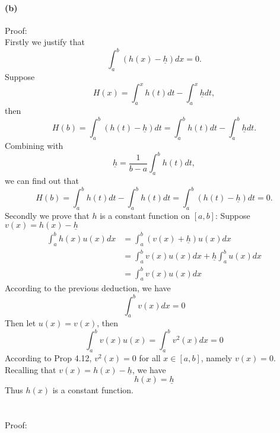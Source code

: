 \documentclass{article}
\begin{document}
\paragraph{(b)} Proof:\\
Firstly we justify that
$$\int_{a}^{b}(h(x)-\underline{h})dx=0.$$
Suppose $$H(x)=\int_{a}^{x}h(t)dt-\int_{a}^{x}\underline{h}dt,$$
then $$H(b)=\int_{a}^{b}(h(t)-\underline{h})dt=\int_{a}^{b}h(t)dt-\int_{a}^{b}\underline{h}dt.$$
Combining  with
$$\underline{h}=\frac{1}{b-a}\int_{a}^{b}h(t)dt,$$
we can find out that 
$$H(b)=\int_{a}^{b}h(t)dt-\int_{a}^{b}h(t)dt=\int_{a}^{b}(h(t)-\underline{h})dt=0.$$
Secondly we prove that $h$ is a constant function on $[a,b]$:
Suppose $v(x)=h(x)-\underline{h}$
\begin{align*}
    \int_{a}^{b}h(x)u(x)dx&=\int_{a}^{b}(v(x)+\underline{h})u(x)dx\\
    &=\int_{a}^{b}v(x)u(x)dx+\underline{h}\int_{a}^{b}u(x)dx\\
    &=\int_{a}^{b}v(x)u(x)dx
\end{align*}
According to the previous deduction, we have
$$\int_{a}^{b}v(x)dx=0$$
Then let $u(x)=v(x)$, then
$$\int_{a}^{b}v(x)u(x)=\int_{a}^{b}v^2(x)dx=0$$
According to Prop 4.12, $v^2(x)=0$ for all $x\in [a,b]$, namely 
$v(x)=0$. Recalling that $v(x)=h(x)-\underline{h}$, we have
$$h(x)=\underline{h}$$
Thus $h(x)$ is a constant function.

\section{}
Proof: \\
\end{document}
